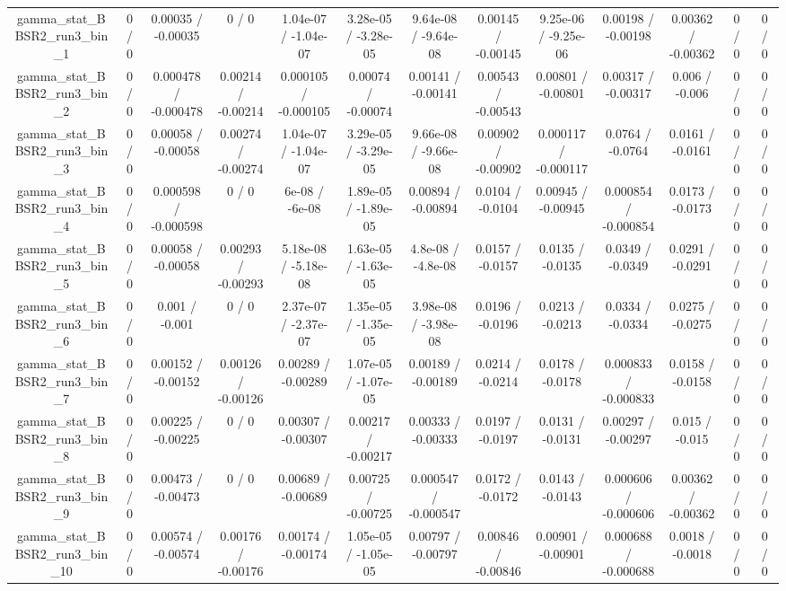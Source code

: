 \documentclass[10pt]{article}
\begin{document}
\begin{table}[htbp]
\begin{center}
\begin{tabular}{|c|c|c|c|c|c|c|c|c|c|c|c|c|}
  gamma_stat_BBSR2_run3_bin_1 & 0 / 0 & 0.00035 / -0.00035 & 0 / 0 & 1.04e-07 / -1.04e-07 & 3.28e-05 / -3.28e-05 & 9.64e-08 / -9.64e-08 & 0.00145 / -0.00145 & 9.25e-06 / -9.25e-06 & 0.00198 / -0.00198 & 0.00362 / -0.00362 & 0 / 0 & 0 / 0 \\ 
  gamma_stat_BBSR2_run3_bin_2 & 0 / 0 & 0.000478 / -0.000478 & 0.00214 / -0.00214 & 0.000105 / -0.000105 & 0.00074 / -0.00074 & 0.00141 / -0.00141 & 0.00543 / -0.00543 & 0.00801 / -0.00801 & 0.00317 / -0.00317 & 0.006 / -0.006 & 0 / 0 & 0 / 0 \\ 
  gamma_stat_BBSR2_run3_bin_3 & 0 / 0 & 0.00058 / -0.00058 & 0.00274 / -0.00274 & 1.04e-07 / -1.04e-07 & 3.29e-05 / -3.29e-05 & 9.66e-08 / -9.66e-08 & 0.00902 / -0.00902 & 0.000117 / -0.000117 & 0.0764 / -0.0764 & 0.0161 / -0.0161 & 0 / 0 & 0 / 0 \\ 
  gamma_stat_BBSR2_run3_bin_4 & 0 / 0 & 0.000598 / -0.000598 & 0 / 0 & 6e-08 / -6e-08 & 1.89e-05 / -1.89e-05 & 0.00894 / -0.00894 & 0.0104 / -0.0104 & 0.00945 / -0.00945 & 0.000854 / -0.000854 & 0.0173 / -0.0173 & 0 / 0 & 0 / 0 \\ 
  gamma_stat_BBSR2_run3_bin_5 & 0 / 0 & 0.00058 / -0.00058 & 0.00293 / -0.00293 & 5.18e-08 / -5.18e-08 & 1.63e-05 / -1.63e-05 & 4.8e-08 / -4.8e-08 & 0.0157 / -0.0157 & 0.0135 / -0.0135 & 0.0349 / -0.0349 & 0.0291 / -0.0291 & 0 / 0 & 0 / 0 \\ 
  gamma_stat_BBSR2_run3_bin_6 & 0 / 0 & 0.001 / -0.001 & 0 / 0 & 2.37e-07 / -2.37e-07 & 1.35e-05 / -1.35e-05 & 3.98e-08 / -3.98e-08 & 0.0196 / -0.0196 & 0.0213 / -0.0213 & 0.0334 / -0.0334 & 0.0275 / -0.0275 & 0 / 0 & 0 / 0 \\ 
  gamma_stat_BBSR2_run3_bin_7 & 0 / 0 & 0.00152 / -0.00152 & 0.00126 / -0.00126 & 0.00289 / -0.00289 & 1.07e-05 / -1.07e-05 & 0.00189 / -0.00189 & 0.0214 / -0.0214 & 0.0178 / -0.0178 & 0.000833 / -0.000833 & 0.0158 / -0.0158 & 0 / 0 & 0 / 0 \\ 
  gamma_stat_BBSR2_run3_bin_8 & 0 / 0 & 0.00225 / -0.00225 & 0 / 0 & 0.00307 / -0.00307 & 0.00217 / -0.00217 & 0.00333 / -0.00333 & 0.0197 / -0.0197 & 0.0131 / -0.0131 & 0.00297 / -0.00297 & 0.015 / -0.015 & 0 / 0 & 0 / 0 \\ 
  gamma_stat_BBSR2_run3_bin_9 & 0 / 0 & 0.00473 / -0.00473 & 0 / 0 & 0.00689 / -0.00689 & 0.00725 / -0.00725 & 0.000547 / -0.000547 & 0.0172 / -0.0172 & 0.0143 / -0.0143 & 0.000606 / -0.000606 & 0.00362 / -0.00362 & 0 / 0 & 0 / 0 \\ 
  gamma_stat_BBSR2_run3_bin_10 & 0 / 0 & 0.00574 / -0.00574 & 0.00176 / -0.00176 & 0.00174 / -0.00174 & 1.05e-05 / -1.05e-05 & 0.00797 / -0.00797 & 0.00846 / -0.00846 & 0.00901 / -0.00901 & 0.000688 / -0.000688 & 0.0018 / -0.0018 & 0 / 0 & 0 / 0 \\ 

\end{tabular}
\end{center}
\end{table}
\end{document}
